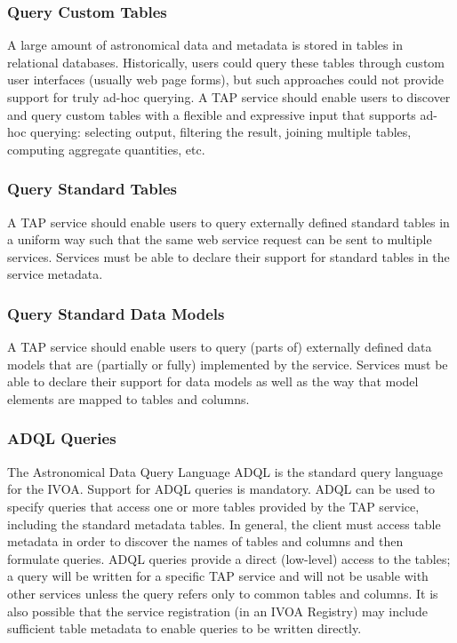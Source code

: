\documentclass[11pt,letter]{ivoa}
\begin{document}
\subsubsection{Query Custom Tables}
A large amount of astronomical data and metadata is stored in tables in 
relational databases. Historically, users could query these tables through 
custom user interfaces (usually web page forms), but such approaches could not 
provide support for truly ad-hoc querying. A TAP service should enable users to 
discover and query custom tables with a flexible and expressive input that 
supports ad-hoc querying: selecting output, filtering the result, joining 
multiple tables, computing aggregate quantities, etc. 

\subsubsection{Query Standard Tables}
A TAP service should enable users to query externally defined standard tables 
in a uniform way such that the same web service request can be sent to multiple 
services. Services must be able to declare their support for standard tables in 
the service metadata.

\subsubsection{Query Standard Data Models}
A TAP service should enable users to query (parts of) externally defined data 
models that are (partially or fully) implemented by the service. Services must 
be able to declare their support for data models as well as the way that model 
elements are mapped to tables and columns.

\subsubsection{ADQL Queries}
The Astronomical Data Query Language ADQL \citep{std:ADQL} is the standard 
query language for the IVOA. Support for ADQL queries is mandatory. ADQL can be 
used to specify queries  that access one or more tables provided by the TAP 
service, including the standard metadata tables. In general, the client must 
access table metadata in order to discover the names of tables and columns and 
then formulate queries. ADQL queries provide a direct (low-level) access to the 
tables; a query will be written for a specific TAP service and will not be 
usable with other services unless the query refers only to common tables and 
columns. It is also possible that the service registration (in an IVOA Registry) 
may include sufficient table metadata to enable queries to be written directly.
\end{document}
